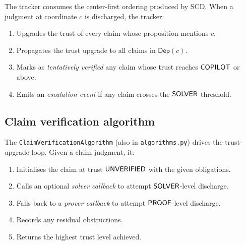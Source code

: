 \documentclass[11pt]{article}
\newcommand{\DepSet}{\mathsf{Dep}}          %
\newcommand{\SCD}{\textsc{SCD}}             %
\begin{document}
The tracker consumes the center-first ordering produced by \SCD{}.
When a judgment at coordinate $c$ is discharged, the tracker:
\begin{enumerate}[noitemsep]
  \item Upgrades the trust of every claim whose proposition mentions $c$.
  \item Propagates the trust upgrade to all claims in $\DepSet(c)$.
  \item Marks as \emph{tentatively verified} any claim whose trust
        reaches $\mathsf{COPILOT}$ or above.
  \item Emits an \emph{escalation event} if any claim crosses the
        $\mathsf{SOLVER}$ threshold.
\end{enumerate}

\subsection{Claim verification algorithm}

The \texttt{ClaimVerificationAlgorithm} (also in
\texttt{algorithms.py}) drives the trust-upgrade loop.  Given a claim
judgment, it:
\begin{enumerate}[noitemsep,label=(\arabic*)]
  \item Initialises the claim at trust $\mathsf{UNVERIFIED}$ with the given
        obligations.
  \item Calls an optional \emph{solver callback} to attempt
        $\mathsf{SOLVER}$-level discharge.
  \item Falls back to a \emph{prover callback} to attempt
        $\mathsf{PROOF}$-level discharge.
  \item Records any residual obstructions.
  \item Returns the highest trust level achieved.
\end{enumerate}
\end{document}

